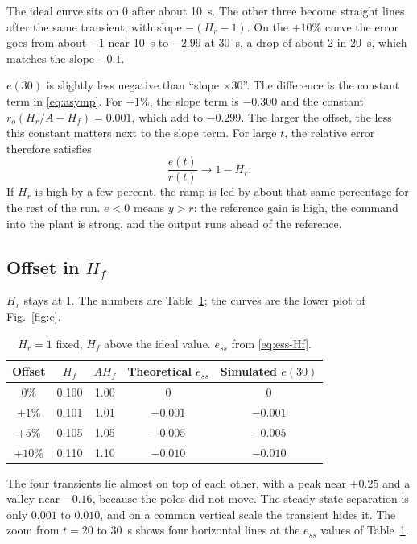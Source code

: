 \documentclass[12pt,a4paper]{article}
\begin{document}
The ideal curve sits on 0 after about 10~s. The other three become straight lines after the same transient, with slope \(-(H_r-1)\).
On the \(+10\%\) curve the error goes from about \(-1\) near 10~s to \(-2.99\) at 30~s, a drop of about 2 in 20~s, which matches the slope \(-0.1\).

\(e(30)\) is slightly less negative than ``slope \(\times 30\)''. The difference is the constant term in \eqref{eq:asymp}.
For \(+1\%\), the slope term is \(-0.300\) and the constant \(r_o(H_r/A-H_f)=0.001\), which add to \(-0.299\).
The larger the offset, the less this constant matters next to the slope term.
For large \(t\), the relative error therefore satisfies
\[
  \frac{e(t)}{r(t)}\to 1-H_r.
\]
If \(H_r\) is high by a few percent, the ramp is led by about that same percentage for the rest of the run.
\(e<0\) means \(y>r\): the reference gain is high, the command into the plant is strong, and the output runs ahead of the reference.

\subsection{Offset in \texorpdfstring{\(H_f\)}{Hf}}

\(H_r\) stays at 1. The numbers are Table~\ref{tab:Hf}; the curves are the lower plot of Fig.~\ref{fig:e}.

\begin{table}[H]
  \centering
  \caption{\(H_r=1\) fixed, \(H_f\) above the ideal value. \(e_{ss}\) from \eqref{eq:ess-Hf}.}
  \label{tab:Hf}
  \begin{tabular}{ccccc}
    \toprule
    Offset & \(H_f\) & \(A H_f\) & Theoretical \(e_{ss}\) & Simulated \(e(30)\) \\
    \midrule
    \(0\%\)   & 0.100 & 1.00 & \(0\)      & \(0\) \\
    \(+1\%\)  & 0.101 & 1.01 & \(-0.001\) & \(-0.001\) \\
    \(+5\%\)  & 0.105 & 1.05 & \(-0.005\) & \(-0.005\) \\
    \(+10\%\) & 0.110 & 1.10 & \(-0.010\) & \(-0.010\) \\
    \bottomrule
  \end{tabular}
\end{table}

The four transients lie almost on top of each other, with a peak near \(+0.25\) and a valley near \(-0.16\), because the poles did not move.
The steady-state separation is only \(0.001\) to \(0.010\), and on a common vertical scale the transient hides it.
The zoom from \(t=20\) to \(30\)~s shows four horizontal lines at the \(e_{ss}\) values of Table~\ref{tab:Hf}.
\end{document}
